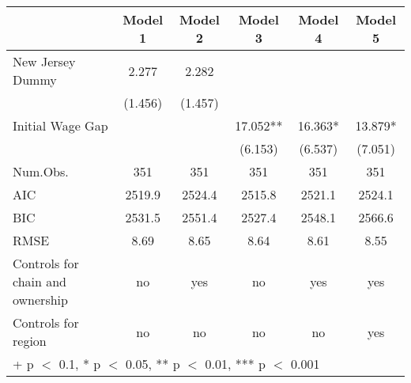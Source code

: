 \begin{table}
\centering
\begin{tabular}[t]{lccccc}
\toprule
  & Model 1 & Model 2 & Model 3 & Model 4 & Model 5\\
\midrule
New Jersey Dummy & \num{2.277} & \num{2.282} &  &  & \\
 & (\num{1.456}) & (\num{1.457}) &  &  & \\
Initial Wage Gap &  &  & \num{17.052}** & \num{16.363}* & \num{13.879}*\\
 &  &  & (\num{6.153}) & (\num{6.537}) & (\num{7.051})\\
\midrule
Num.Obs. & \num{351} & \num{351} & \num{351} & \num{351} & \num{351}\\
AIC & \num{2519.9} & \num{2524.4} & \num{2515.8} & \num{2521.1} & \num{2524.1}\\
BIC & \num{2531.5} & \num{2551.4} & \num{2527.4} & \num{2548.1} & \num{2566.6}\\
RMSE & \num{8.69} & \num{8.65} & \num{8.64} & \num{8.61} & \num{8.55}\\
Controls for chain and ownership & no & yes & no & yes & yes\\
Controls for region & no & no & no & no & yes\\
\bottomrule
\multicolumn{6}{l}{\rule{0pt}{1em}+ p $<$ 0.1, * p $<$ 0.05, ** p $<$ 0.01, *** p $<$ 0.001}\\
\end{tabular}
\end{table}
